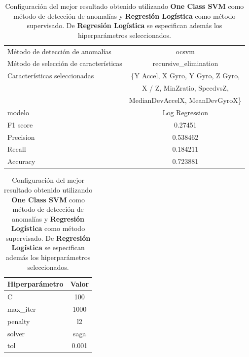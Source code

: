 \begin{appendices}
		\begin{table}[htb]
			\centering
			\caption{Configuración del mejor resultado obtenido utilizando \textbf{One Class SVM} como método de detección de anomalías y \textbf{Regresión Logística}
			como método supervisado. De \textbf{Regresión Logística} se especifican además los hiperparámetros seleccionados.}
			\label{table:32}
			\begin{tabular}{lc}
				\toprule
					  Método de detección de anomalías &                                              ocsvm \\
				Método de selección de características &                              recursive\_elimination \\
						 Características seleccionadas & \{Y Accel, X Gyro, Y Gyro, Z Gyro, \\ 
						 							   &  X / Z,  MinZratio, SpeedvsZ, \\
													   &  MedianDevAccelX, MeanDevGyroX\} \\
												modelo &                                     Log Regression \\
											  F1 score &                                            0.27451 \\
											 Precision &                                           0.538462 \\
												Recall &                                           0.184211 \\
											  Accuracy &                                           0.723881 \\
				\bottomrule
				\end{tabular}
			\newline
			\newline

			\begin{tabular}{lc}
				\toprule
				Hiperparámetro &  Valor \\
				\midrule
							 C &    100 \\
					  max\_iter &   1000 \\
					   penalty &     l2 \\
						solver &   saga \\
						   tol &  0.001 \\
				\bottomrule
				\end{tabular}
			

\end{table}
\end{appendices}

